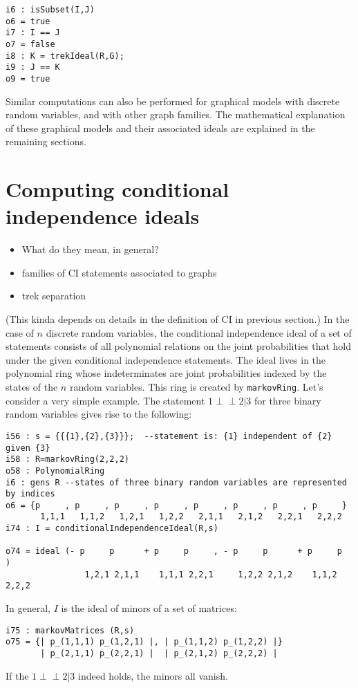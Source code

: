 \documentclass[letterpaper]{article}
\theoremstyle{definition}
\def\ci{\perp\!\!\!\perp}
\begin{document}
\begin{verbatim}
i6 : isSubset(I,J)
o6 = true
i7 : I == J
o7 = false
i8 : K = trekIdeal(R,G);
i9 : J == K
o9 = true
\end{verbatim}

Similar computations can also be performed for graphical models
with discrete random variables,
and with other graph families.  The mathematical explanation of
these graphical models and their associated ideals
are explained in the remaining sections.


\section{Computing conditional independence ideals}

\begin{itemize}
\item What do they mean, in general? 
\item  families of CI statements associated to graphs
\item trek separation
\end{itemize}

(This kinda depends on details in the definition of CI in previous section.)
In the case of $n$ discrete random variables, the conditional independence ideal of a set of statements consists of all polynomial relations on the joint probabilities that hold under the given conditional independence statements.  The ideal lives in the polynomial ring whose indeterminates are joint probabilities indexed by the states of the $n$ random variables. This ring is created by {\tt markovRing}.
Let's consider a very simple example. The statement $1\ci 2 | 3$ for three binary random variables gives rise to the following:

\begin{verbatim}
i56 : s = {{{1},{2},{3}}};  --statement is: {1} independent of {2} given {3}
i58 : R=markovRing(2,2,2) 
o58 : PolynomialRing
i6 : gens R --states of three binary random variables are represented by indices
o6 = {p     , p     , p     , p     , p     , p     , p     , p     }
       1,1,1   1,1,2   1,2,1   1,2,2   2,1,1   2,1,2   2,2,1   2,2,2
i74 : I = conditionalIndependenceIdeal(R,s)

o74 = ideal (- p     p      + p     p     , - p     p      + p     p     )
                1,2,1 2,1,1    1,1,1 2,2,1     1,2,2 2,1,2    1,1,2 2,2,2
\end{verbatim}
In general, $I$ is the ideal of minors of a set of matrices: 
\begin{verbatim}
i75 : markovMatrices (R,s)
o75 = {| p_(1,1,1) p_(1,2,1) |, | p_(1,1,2) p_(1,2,2) |}
       | p_(2,1,1) p_(2,2,1) |  | p_(2,1,2) p_(2,2,2) |
\end{verbatim}
If the $1\ci 2 | 3$  indeed holds, the minors all vanish. 
\end{document}
